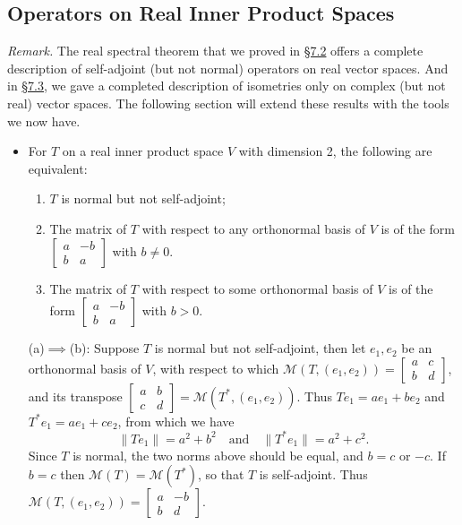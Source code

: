 \documentclass[11pt]{article}
\newcommand{\lk}[2]{\hyperlink{subsection.#1.#2}{\S#1.#2}}
\newcommand{\nm}[1]{\|#1\|}
\newcommand{\M}{\mathcal{M}}
\begin{document}
\subsection{Operators on Real Inner Product Spaces}
\textit{Remark.} The real spectral theorem that we proved in \lk{7}{2} offers a complete description of self-adjoint (but not normal) operators on real vector spaces. And in \lk{7}{3}, we gave a completed description of isometries only on complex (but not real) vector spaces. The following section will extend these results with the tools we now have.
\begin{itemize}
    \item For $T$ on a real inner product space $V$ with dimension 2, the following are equivalent:
    \begin{enumerate}[label=(\alph*)]
        \item $T$ is normal but not self-adjoint;
        \item The matrix of $T$ with respect to any orthonormal basis of $V$ is of the form $\begin{bmatrix}
            a & -b \\ b & a
        \end{bmatrix}$ with $b \neq 0$.
        \item The matrix of $T$ with respect to some orthonormal basis of $V$ is of the form $\begin{bmatrix}
            a & -b \\ b & a
        \end{bmatrix}$ with $b > 0$.
    \end{enumerate}
    
    (a)$\implies$(b): Suppose $T$ is normal but not self-adjoint, then let $e_1,e_2$ be an orthonormal basis of $V$, with respect to which $\M(T,(e_1,e_2)) = \begin{bmatrix}
        a & c \\ b & d
    \end{bmatrix}$, and its transpose $\begin{bmatrix}
        a & b \\ c & d
    \end{bmatrix} = \M(T^*,(e_1,e_2))$. Thus $Te_1 = a e_1 + b e_2$ and $T^*e_1 = ae_1 + ce_2$, from which we have \[\nm{Te_1} = a^2 + b^2 \quad \text{and} \quad \nm{T^*e_1} = a^2 + c^2.\] Since $T$ is normal, the two norms above should be equal, and $b = c$ or $-c$. If $b = c$ then $\M(T) = \M(T^*)$, so that $T$ is self-adjoint. Thus $\M(T,(e_1,e_2)) = \begin{bmatrix}
        a & -b \\ b & d
    \end{bmatrix}$.


\end{itemize}
\end{document}
